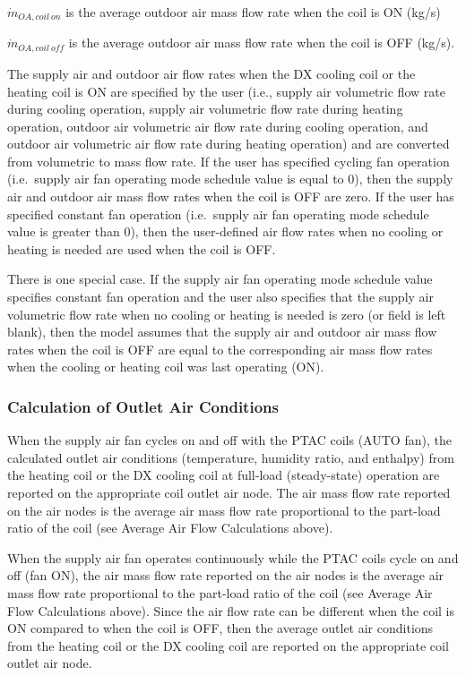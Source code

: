 \(\dot{m}_{OA,coil~on}\) is the average outdoor air mass flow rate when the coil is ON (kg/s)

\(\dot{m}_{OA,coil~off}\) is the average outdoor air mass flow rate when the coil is OFF (kg/s).

The supply air and outdoor air flow rates when the DX cooling coil or the heating coil is ON are specified by the user (i.e., supply air volumetric flow rate during cooling operation, supply air volumetric flow rate during heating operation, outdoor air volumetric air flow rate during cooling operation, and outdoor air volumetric air flow rate during heating operation) and are converted from volumetric to mass flow rate. If the user has specified cycling fan operation (i.e.~supply air fan operating mode schedule value is equal to 0), then the supply air and outdoor air mass flow rates when the coil is OFF are zero. If the user has specified constant fan operation (i.e.~supply air fan operating mode schedule value is greater than 0), then the user-defined air flow rates when no cooling or heating is needed are used when the coil is OFF.

There is one special case. If the supply air fan operating mode schedule value specifies constant fan operation and the user also specifies that the supply air volumetric flow rate when no cooling or heating is needed is zero (or field is left blank), then the model assumes that the supply air and outdoor air mass flow rates when the coil is OFF are equal to the corresponding air mass flow rates when the cooling or heating coil was last operating (ON).

\subsubsection{Calculation of Outlet Air Conditions}\label{calculation-of-outlet-air-conditions}

When the supply air fan cycles on and off with the PTAC coils (AUTO fan), the calculated outlet air conditions (temperature, humidity ratio, and enthalpy) from the heating coil or the DX cooling coil at full-load (steady-state) operation are reported on the appropriate coil outlet air node. The air mass flow rate reported on the air nodes is the average air mass flow rate proportional to the part-load ratio of the coil (see Average Air Flow Calculations above).

When the supply air fan operates continuously while the PTAC coils cycle on and off (fan ON), the air mass flow rate reported on the air nodes is the average air mass flow rate proportional to the part-load ratio of the coil (see Average Air Flow Calculations above). Since the air flow rate can be different when the coil is ON compared to when the coil is OFF, then the average outlet air conditions from the heating coil or the DX cooling coil are reported on the appropriate coil outlet air node.

